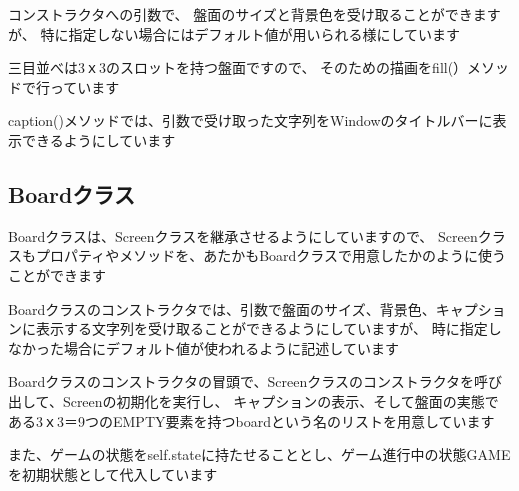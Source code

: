 \documentclass[uplatex,a4paper,11pt,oneside,openany]{jsbook}
\begin{document}
コンストラクタへの引数で、
盤面のサイズと背景色を受け取ることができますが、
特に指定しない場合にはデフォルト値が用いられる様にしています

三目並べは3ｘ3のスロットを持つ盤面ですので、
そのための描画をfill(）メソッドで行っています

caption()メソッドでは、引数で受け取った文字列をWindowのタイトルバーに表示できるようにしています

\subsection{Boardクラス}

Boardクラスは、Screenクラスを継承させるようにしていますので、
Screenクラスもプロパティやメソッドを、あたかもBoardクラスで用意したかのように使うことができます

Boardクラスのコンストラクタでは、引数で盤面のサイズ、背景色、キャプションに表示する文字列を受け取ることができるようにしていますが、
時に指定しなかった場合にデフォルト値が使われるように記述しています

Boardクラスのコンストラクタの冒頭で、Screenクラスのコンストラクタを呼び出して、Screenの初期化を実行し、
キャプションの表示、そして盤面の実態である3ｘ3＝9つのEMPTY要素を持つboardという名のリストを用意しています

また、ゲームの状態をself.stateに持たせることとし、ゲーム進行中の状態GAMEを初期状態として代入しています
\end{document}
